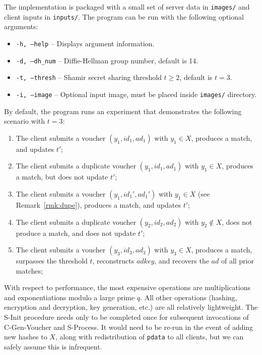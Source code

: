 The implementation is packaged with a small set of server data in \texttt{images/} and client inputs in \texttt{inputs/}. The program can be run with the following optional arguments:
\begin{itemize}
	\item \texttt{-h, --help} -- Displays argument information.
	\item \texttt{-d, --dh_num} -- Diffie-Hellman group number, default is 14.
	\item \texttt{-t, --thresh} -- Shamir secret sharing threshold $t \geq 2 $, default is $t = 3$.
	\item \texttt{-i, --image} -- Optional input image, must be placed inside \texttt{images/} directory.
\end{itemize}
By default, the program runs an experiment that demonstrates the following scenario with $t = 3$:
\begin{enumerate}{}
	\item The client submits a voucher $(y_1, id_1, ad_1)$ with $y_1 \in X$, produces a match, and updates $t'$;
	\item The client submits a duplicate voucher  $(y_1, id_1, ad_1)$ with $y_1 \in X$, produces a match, but does not update $t'$;
	\item The client submits a voucher  $(y_1, id_1', ad_1')$ with $y_1 \in X$ (see Remark~\ref{rmk:dupe}), produces a match, and updates $t'$;
	\item The client submits a duplicate voucher  $(y_2, id_2, ad_2)$ with $y_2 \nin X$, does not produce a match, and does not update $t'$;
	\item The client submits a voucher $(y_3, id_3, ad_3)$ with $y_3 \in X$, produces a match, surpasses the threshold $t$, reconstructs $adkey$, and recovers the $ad$ of all prior matches;
\end{enumerate}

With respect to performance, the most expensive operations are multiplications and exponentiations modulo a large prime $q$. All other operations (hashing, encryption and decryption, key generation, etc.) are all relatively lightweight. The {\sf S-Init} procedure needs only to be completed once for subsequent invocations of {\sf C-Gen-Voucher} and {\sf S-Process}. It would need to be re-run in the event of adding new hashes to $X$, along with redistribution of \texttt{pdata} to all clients, but we can safely assume this is infrequent.

